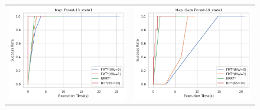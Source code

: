 \documentclass{article}
\begin{document}
\begin{figure}
{\begin{tabular}{cc}
			\includegraphics[scale=0.45]{srVet_Forest-13_state1.png} & \includegraphics[scale=0.45]{srVet_Gaps Forest-19_state1.png}    \\

\end{tabular}}
\end{figure}
\end{document}
